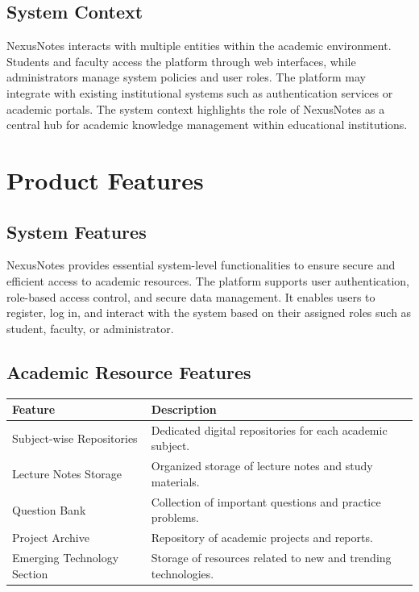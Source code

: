 \documentclass[12pt,a4paper]{report}
\begin{document}
\section{System Context}
NexusNotes interacts with multiple entities within the academic environment. Students and faculty access the platform through web interfaces, while administrators manage system policies and user roles. The platform may integrate with existing institutional systems such as authentication services or academic portals. The system context highlights the role of NexusNotes as a central hub for academic knowledge management within educational institutions.

\chapter{Product Features}

\section{System Features}
NexusNotes provides essential system-level functionalities to ensure secure and efficient access to academic resources. The platform supports user authentication, role-based access control, and secure data management. It enables users to register, log in, and interact with the system based on their assigned roles such as student, faculty, or administrator.

\section{Academic Resource Features}

\begin{center}
\begin{tabular}{|l|p{8cm}|}
\hline
Feature & Description \\
\hline
Subject-wise Repositories & Dedicated digital repositories for each academic subject. \\
\hline
Lecture Notes Storage & Organized storage of lecture notes and study materials. \\
\hline
Question Bank & Collection of important questions and practice problems. \\
\hline
Project Archive & Repository of academic projects and reports. \\
\hline
Emerging Technology Section & Storage of resources related to new and trending technologies. \\
\hline
\end{tabular}
\end{center}
\end{document}
